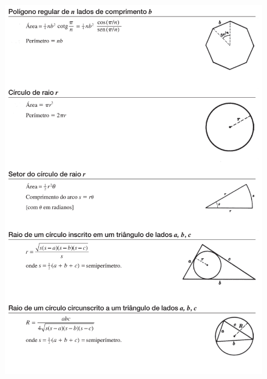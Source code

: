 \begin{figure}[H]
    \centering
    \includegraphics[width=\textwidth]{matematica/geometria/formulas2}
\end{figure}

